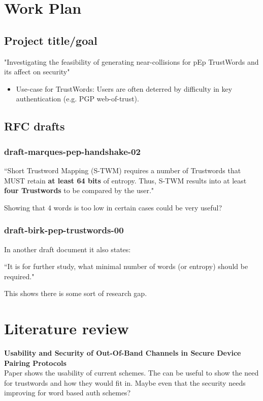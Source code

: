 \section{Work Plan}

\subsection{Project title/goal}

"Investigating the feasibility of generating near-collisions for pEp TrustWords and its affect on security"

\begin{itemize}
    \item Use-case for TrustWords: Users are often deterred by difficulty in key authentication (e.g. PGP web-of-trust).
\end{itemize}


\subsection{RFC drafts}
\subsubsection{draft-marques-pep-handshake-02}
``Short Trustword Mapping (S-TWM) requires a number of Trustwords that MUST retain \textbf{at least 64 bits} of entropy.  Thus, S-TWM results into at least \textbf{four Trustwords} to be compared by the user."

Showing that 4 words is too low in certain cases could be very useful?

\subsubsection{draft-birk-pep-trustwords-00}
In another draft document it also states:

``It is for further study, what minimal number of words (or entropy) should be required."

This shows there is some sort of research gap.

\section{Literature review}
\label{litReview}

\textbf{Usability and Security of Out-Of-Band Channels in Secure Device Pairing Protocols}\\
Paper shows the usability of current schemes. The can be useful to show the need for trustwords and how they would fit in. Maybe even that the security needs improving for word based auth schemes?

